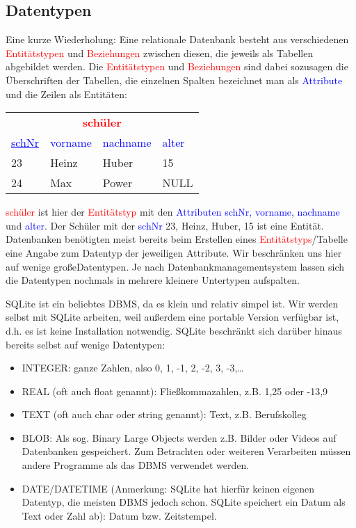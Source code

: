 \subsection{Datentypen}
Eine kurze Wiederholung: Eine relationale Datenbank besteht aus verschiedenen \textcolor{red}{Entitätstypen} und \textcolor{red}{Beziehungen} zwischen diesen, die jeweils als Tabellen abgebildet werden. Die \textcolor{red}{Entitätstypen} und \textcolor{red}{Beziehungen} sind dabei sozusagen die Überschriften der Tabellen, die einzelnen Spalten bezeichnet man als \textcolor{blue}{Attribute} und die Zeilen als Entitäten:

\begin{table}[h]
	\centering
	\begin{tabular}{llll}
		\multicolumn{4}{c}{\textcolor{red}{\textbf{schüler}}}\\
		\textcolor{blue}{\underline{schNr}} 	& \textcolor{blue}{vorname} 	& \textcolor{blue}{nachname}	& \textcolor{blue}{alter}  \\
		\midrule
		23&Heinz&Huber&15\\
		24&Max&Power&NULL\\
	\end{tabular}
\end{table}
\textcolor{red}{schüler} ist hier der \textcolor{red}{Entitätstyp} mit den \textcolor{blue}{Attributen schNr, vorname, nachname} und \textcolor{blue}{alter}. Der Schüler mit der \textcolor{blue}{schNr} 23, Heinz, Huber, 15 ist eine Entität.
Datenbanken benötigten meist bereits beim Erstellen eines \textcolor{red}{Entitätstyps}/Tabelle eine Angabe zum Datentyp der jeweiligen Attribute. Wir beschränken uns hier auf wenige \glqq große\grqq{ }Datentypen. Je nach Datenbankmanagementsystem lassen sich die Datentypen nochmals in mehrere kleinere Untertypen aufspalten.

SQLite ist ein beliebtes DBMS, da es klein und relativ simpel ist. Wir werden selbst mit SQLite arbeiten, weil außerdem eine portable Version verfügbar ist, d.h. es ist keine Installation notwendig. SQLite beschränkt sich darüber hinaus bereits selbst auf wenige Datentypen:
\begin{tcolorbox}[title=Datentypen]
	\begin{itemize}
		\item INTEGER: ganze Zahlen, also 0, 1, -1, 2, -2, 3, -3,\dots
		\item REAL (oft auch float genannt): Fließkommazahlen, z.B. 1,25 oder -13,9
		\item TEXT (oft auch char oder string genannt): Text, z.B. Berufskolleg
		\item BLOB: Als sog. Binary Large Objects werden z.B. Bilder oder Videos auf Datenbanken gespeichert. Zum Betrachten oder weiteren Verarbeiten müssen andere Programme als das DBMS verwendet werden.
		\item DATE/DATETIME (Anmerkung: SQLite hat hierfür keinen eigenen Datentyp, die meisten DBMS jedoch schon. SQLite speichert ein Datum als Text oder Zahl ab): Datum bzw. Zeitstempel.
	\end{itemize}
\end{tcolorbox}

